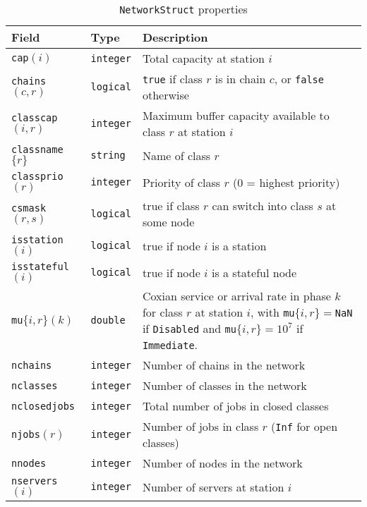 \begin{table}[thbp]
{\footnotesize
\renewcommand{\arraystretch}{1.2}
\centering
\caption{\texttt{NetworkStruct} properties} %
\begin{tabular}{|l|l|p{9.5cm}|}
\hline
\textbf{Field} & \textbf{Type} & \textbf{Description} \\
\hline
\texttt{cap}$(i)$ & \texttt{integer} & Total capacity at station $i$ \\\hline
\texttt{chains}$(c,r)$ & \texttt{logical} &  \texttt{true} if class $r$ is in chain $c$, or \texttt{false} otherwise \\\hline
\texttt{classcap}$(i,r)$ & \texttt{integer} & Maximum buffer capacity available to class $r$ at station $i$ \\\hline
\texttt{classname}$\{r\}$ & \texttt{string} & Name of class $r$\\\hline
\texttt{classprio}$(r)$ & \texttt{integer} & Priority of class $r$ (0 = highest priority)\\\hline
\texttt{csmask}$(r,s)$ & \texttt{logical} & true if class $r$ can switch into class $s$ at some node\\\hline
{\texttt{isstation}}$(i)$ & {\texttt{logical}} & true if node $i$ is a station\\\hline
{\texttt{isstateful}}$(i)$ & {\texttt{logical}} & true if node $i$ is a stateful node\\\hline
\texttt{mu}$\{i,r\}(k)$ & \texttt{double} & Coxian service or arrival rate in phase $k$ for class $r$ at station $i$, with \texttt{mu}$\{i,r\}=$\texttt{NaN} if \texttt{Disabled} and \texttt{mu}$\{i,r\}=10^7$ if \texttt{Immediate}.\\\hline
\texttt{nchains} & \texttt{integer} & Number of chains in the network\\\hline
\texttt{nclasses} & \texttt{integer} & Number of classes in the network\\\hline
\texttt{nclosedjobs} & \texttt{integer} & Total number of jobs in closed classes\\\hline
\texttt{njobs}$(r)$ & \texttt{integer} & Number of jobs in class $r$ (\texttt{Inf} for open classes)\\\hline
\texttt{nnodes} & \texttt{integer} & Number of nodes in the network\\\hline
\texttt{nservers}$(i)$ & \texttt{integer} & Number of servers at station $i$\\\hline

\end{tabular}}
\end{table}

